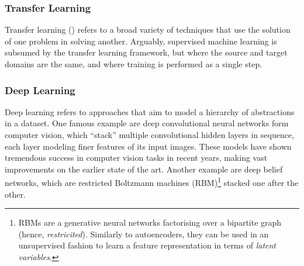 \documentclass[11pt]{amsart}
\begin{document}
\subsubsection{Transfer Learning}

Transfer learning (\cite{transfersurvey}) refers to a broad variety of techniques that use the solution of one problem in solving another. Arguably, supervised machine learning is subsumed by the transfer learning framework, but where the source and target domains are the same, and where training is performed as a single step.

\subsubsection{Deep Learning}

Deep learning refers to approaches that aim to model a hierarchy of abstractions in a dataset. One famous example are deep convolutional neural networks form computer vision, which ``stack'' multiple convolutional hidden layers in sequence, each layer modeling finer features of its input images. These models have shown tremendous success in computer vision tasks in recent years, making vast improvements on the earlier state of the art. Another example are deep belief networks, which are restricted Boltzmann machines (RBM)\footnote{RBMs are a generative neural networks factorising over a bipartite graph (hence, \emph{restricited}). Similarly to autoencoders, they can be used in an unsupervised fashion to learn a feature representation in terms of \emph{latent variables}.} stacked one after the other.
\end{document}
